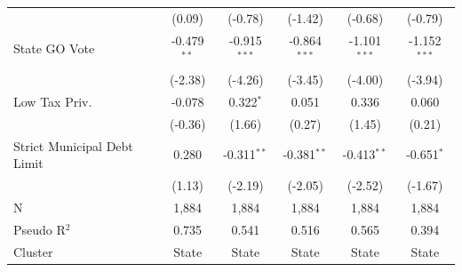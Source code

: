\begin{tabular*}{\textwidth}{@{\extracolsep{\fill}}lccccc}
                               & (0.09)       & (-0.78)       & (-1.42)       & (-0.68)       & (-0.79)\\   
   State GO Vote               & -0.479$^{**}$ & -0.915$^{***}$ & -0.864$^{***}$ & -1.101$^{***}$ & -1.152$^{***}$\\   
                               & (-2.38)      & (-4.26)       & (-3.45)       & (-4.00)       & (-3.94)\\   
   Low Tax Priv.               & -0.078        & 0.322$^{*}$    & 0.051          & 0.336          & 0.060\\   
                               & (-0.36)      & (1.66)        & (0.27)        & (1.45)        & (0.21)\\   
   Strict Municipal Debt Limit & 0.280         & -0.311$^{**}$  & -0.381$^{**}$  & -0.413$^{**}$  & -0.651$^{*}$\\   
                               & (1.13)       & (-2.19)       & (-2.05)       & (-2.52)       & (-1.67)\\   
   \hline
   N                & 1,884         & 1,884          & 1,884          & 1,884          & 1,884\\  
   Pseudo R$^2$                & 0.735         & 0.541          & 0.516          & 0.565          & 0.394\\  
   Cluster              & State & State & State & State & State\\  
   \bottomrule
\end{tabular*}
\par\endgroup
